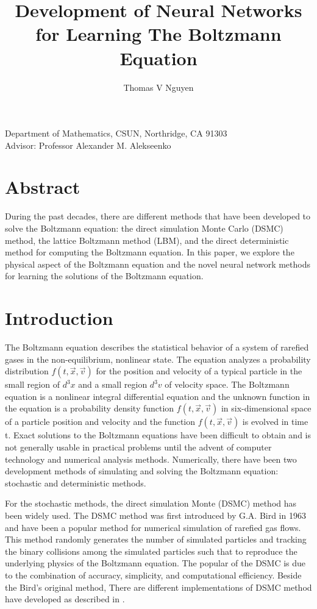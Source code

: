 \documentclass{article}
\begin{document}
\title{Development of Neural Networks for Learning The Boltzmann Equation	 }
\author{Thomas V Nguyen}
\maketitle
\begin{center}
Department of Mathematics, CSUN, Northridge, CA 91303 \\
Advisor: Professor Alexander M. Alekseenko
\end{center}
\section*{Abstract} During the past decades, there are different methods that have been developed to solve the Boltzmann equation: the direct simulation Monte Carlo (DSMC) method, the lattice Boltzmann method (LBM), and the direct deterministic method for computing the Boltzmann equation. In this paper, we explore the physical aspect of the Boltzmann equation and the novel neural network methods for learning the solutions of the Boltzmann equation.
\section{Introduction} \label{Intro}
The Boltzmann equation describes the statistical behavior of a system of rarefied gases in the non-equilibrium, nonlinear state. The equation analyzes a probability distribution $f(t,\vec{x}, \vec{v})$ for the position and velocity of a typical particle in the small region of $d^3x$ and a small region $d^3v$ of velocity space. The Boltzmann equation is a nonlinear integral differential equation and the unknown function in the equation is a probability density function $f(t,\vec{x}, \vec{v})$ in six-dimensional space of a particle position and velocity and the function $f(t,\vec{x}, \vec{v})$ is evolved in time t. Exact solutions to the Boltzmann equations have been difficult to obtain and is not generally usable in practical problems until the advent of computer technology and numerical analysis methods. Numerically, there have been two development methods of simulating and solving the Boltzmann equation: stochastic and deterministic methods. 

For the stochastic methods, the direct simulation Monte (DSMC) method has been widely used. The DSMC method was first introduced by G.A. Bird in 1963 \cite{BirdGA1} and have been a popular method for numerical simulation of rarefied gas flows. This method randomly generates the number of simulated particles and tracking the binary collisions among the simulated particles such that to reproduce the underlying physics of the Boltzmann equation. The popular of the DSMC is due to the combination of accuracy, simplicity, and computational efficiency. Beside the Bird’s original method, There are different implementations of DSMC method have developed as described in \cite{DSMC1, DSMC2, DSMC3}. 
\end{document}
